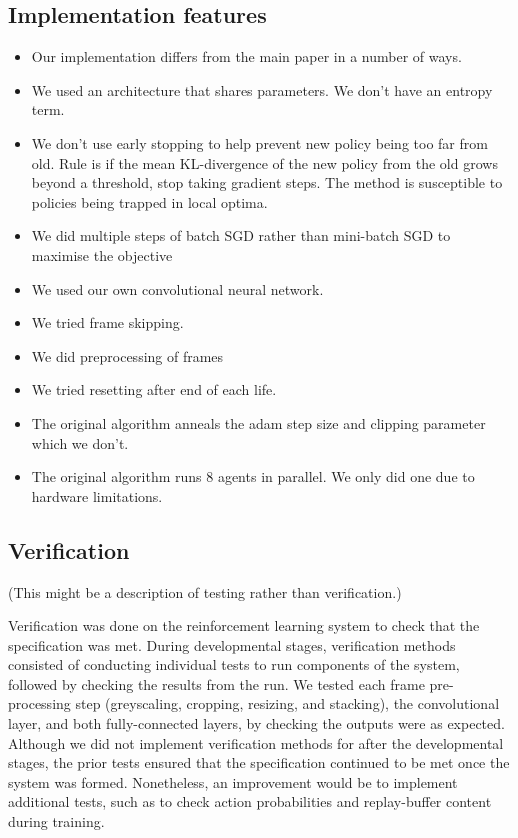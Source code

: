 \documentclass[12pt,a4paper]{article}
\begin{document}
\subsection{Implementation features}
\begin{itemize}
    \item Our implementation differs from the main paper in a number of ways.
    \item We used an architecture that shares parameters. We don't have an entropy term.
    \item We don't use early stopping to help prevent new policy being too far from old. Rule is if the mean KL-divergence of the new policy from the old grows beyond a threshold, stop taking gradient steps. The method is susceptible to policies being trapped in local optima.
    \item We did multiple steps of batch SGD rather than mini-batch SGD to maximise the objective
    \item We used our own convolutional neural network.
    \item We tried frame skipping.
    \item We did preprocessing of frames
    \item We tried resetting after end of each life. 
    \item The original algorithm anneals the adam step size and clipping parameter which we don't.
    \item The original algorithm runs 8 agents in parallel. We only did one due to hardware limitations.
\end{itemize}

\subsection{Verification}
(This might be a description of testing rather than verification.)

Verification was done on the reinforcement learning system to check that the specification was met. During developmental stages, verification methods consisted of conducting individual tests to run components of the system, followed by checking the results from the run. We tested each frame pre-processing step (greyscaling, cropping, resizing, and stacking), the convolutional layer, and both fully-connected layers, by checking the outputs were as expected. Although we did not implement verification methods for after the developmental stages, the prior tests ensured that the specification continued to be met once the system was formed. Nonetheless, an improvement would be to implement additional tests, such as to check action probabilities and replay-buffer content during training.
\end{document}
